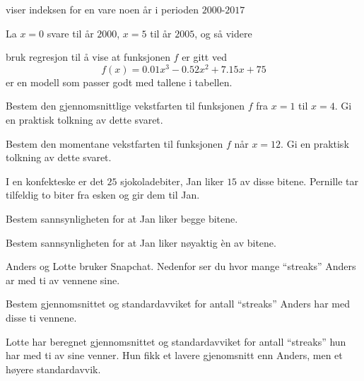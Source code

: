 \Oppgave[6] %

viser indeksen for en vare noen år i perioden $2000$-$2017$

La $x=0$ svare til år $2000$, $x=5$ til år $2005$, og så videre

\begin{oppgaver}
     bruk regresjon til å vise at funksjonen $f$ er gitt ved
    \begin{equation*}
        f(x) = \num{0.01} x^3 - \num{0.52}x^2 + \num{7.15}x + 75
    \end{equation*}
    er en modell som passer godt med tallene i tabellen.
\end{oppgaver}

\begin{oppgaver}
     Bestem den gjennomsnittlige vekstfarten til funksjonen $f$ fra $x =
    1$ til $x = 4$.  Gi en praktisk tolkning av dette svaret.
\end{oppgaver}

\begin{oppgaver}
     Bestem den momentane vekstfarten til funksjonen $f$ når $x = 12$.
    Gi en praktisk tolkning av dette svaret.
\end{oppgaver}


\Oppgave[4] %

I en konfekteske er det $25$ sjokoladebiter, Jan liker $15$ av disse bitene.
Pernille tar tilfeldig to biter fra esken og gir dem til Jan.

\begin{oppgaver}
     Bestem sannsynligheten for at Jan liker begge bitene.
\end{oppgaver}

\begin{oppgaver}
     Bestem sannsynligheten for at Jan liker nøyaktig èn av bitene.
\end{oppgaver}


\Oppgave[4] %

Anders og Lotte bruker Snapchat. Nedenfor ser du hvor mange \enquote{streaks}
Anders ar med ti av vennene sine.

\begin{oppgaver}
     Bestem gjennomsnittet og standardavviket for antall
    \enquote{streaks} Anders har med disse ti vennene.
\end{oppgaver}

Lotte har beregnet gjennomsnittet og standardavviket for antall
\enquote{streaks} hun har med ti av sine venner. Hun fikk et lavere gjenomsnitt
enn Anders, men et høyere standardavvik.

